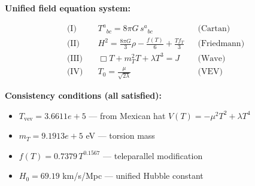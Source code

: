 
\textbf{Unified field equation system:}

\begin{align}
  \text{(I)} \quad & T^a{}_{bc} = 8\pi G \, s^a{}_{bc} && \text{(Cartan)} \\
  \text{(II)} \quad & H^2 = \frac{8\pi G}{3}\rho - \frac{f(T)}{6} + \frac{Tf_T}{3} && \text{(Friedmann)} \\
  \text{(III)} \quad & \Box T + m_T^2 T + \lambda T^3 = J && \text{(Wave)} \\
  \text{(IV)} \quad & T_0 = \frac{\mu}{\sqrt{2\lambda}} && \text{(VEV)}
\end{align}

\textbf{Consistency conditions (all satisfied):}
\begin{itemize}
  \item $T_{\text{vev}} = 3.6611e+5$ — from Mexican hat $V(T) = -\mu^2 T^2 + \lambda T^4$
  \item $m_T = 9.1913e+5$ eV — torsion mass
  \item $f(T) = 0.7379 \, T^{0.1567}$ — teleparallel modification
  \item $H_0 = 69.19$ km/s/Mpc — unified Hubble constant
\end{itemize}